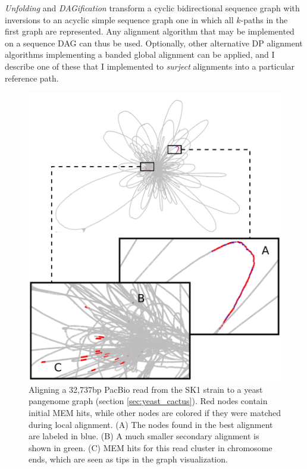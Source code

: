 \emph{Unfolding} and \emph{DAGification} transform a cyclic bidirectional sequence graph with inversions to an acyclic simple sequence graph one in which all $k$-paths in the first graph are represented.
Any alignment algorithm that may be implemented on a sequence DAG can thus be used.
Optionally, other alternative DP alignment algorithms implementing a banded global alignment can be applied, and I describe one of these that I implemented to \emph{surject} alignments into a particular reference path.

\begin{figure}[htbp!]
\centering
\includegraphics[width=1.0\textwidth]{Chapter2/Figs/mapping_cactus_pacbio_aln_vizzy.pdf}
\caption[Alignment of a PacBio read to a yeast pangenome]{
  Aligning a 32,737bp PacBio read from the SK1 strain to a yeast pangenome graph (section \ref{sec:yeast_cactus}).
  Red nodes contain initial MEM hits, while other nodes are colored if they were matched during local alignment.
  (A) The nodes found in the best alignment are labeled in blue.
  (B) A much smaller secondary alignment is shown in green.
  (C) MEM hits for this read cluster in chromosome ends, which are seen as tips in the graph visualization.
}
\label{fig:alignment_to_cactus_yeast}
\end{figure}


